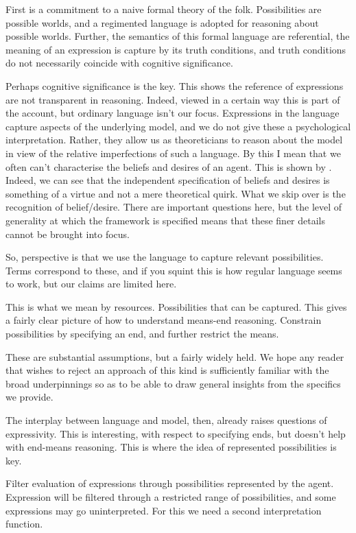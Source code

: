\documentclass[10pt]{article}
\begin{document}
First is a commitment to a naive formal theory of the folk.
Possibilities are possible worlds, and a regimented language is adopted for reasoning about possible worlds.
Further, the semantics of this formal language are referential, the meaning of an expression is capture by its truth conditions, and truth conditions do not necessarily coincide with cognitive significance.

Perhaps cognitive significance is the key.
This shows the reference of expressions are not transparent in reasoning.
Indeed, viewed in a certain way this is part of the account, but ordinary language isn't our focus.
Expressions in the language capture aspects of the underlying model, and we do not give these a psychological interpretation.
Rather, they allow us as theoreticians to reason about the model in view of the relative imperfections of such a language.
By this I mean that we often can't characterise the beliefs and desires of an agent.
This is shown by \citeauthor{Humberstone:2013aa}.
Indeed, we can see that the independent specification of beliefs and desires is something of a virtue and not a mere theoretical quirk.
What we skip over is the recognition of belief/desire.
There are important questions here, but the level of generality at which the framework is specified means that these finer details cannot be brought into focus.

So, perspective is that we use the language to capture relevant possibilities.
Terms correspond to these, and if you squint this is how regular language seems to work, but our claims are limited here.

This is what we mean by resources.
Possibilities that can be captured.
This gives a fairly clear picture of how to understand means-end reasoning.
Constrain possibilities by specifying an end, and further restrict the means.

These are substantial assumptions, but a fairly widely held.
We hope any reader that wishes to reject an approach of this kind is sufficiently familiar with the broad underpinnings so as to be able to draw general insights from the specifics we provide.

The interplay between language and model, then, already raises questions of expressivity.
This is interesting, with respect to specifying ends, but doesn't help with end-means reasoning.
This is where the idea of represented possibilities is key.

Filter evaluation of expressions through possibilities represented by the agent.
Expression will be filtered through a restricted range of possibilities, and some expressions may go uninterpreted.
For this we need a second interpretation function.
\end{document}
